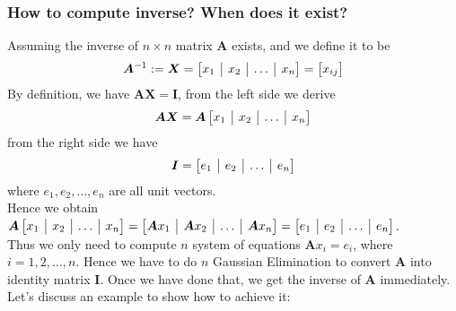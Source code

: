 \subsubsection{How to compute inverse? When does it exist?}
Assuming the inverse of $n\times n$ matrix $\bm A$ exists, and we define it to be
\[
\bm A^{-1}:=\bm X = \left[
\begin{array}{@{}c|c|c|c@{}}
x_1&x_2&\ldots&x_n
\end{array} \right] = \begin{bmatrix}
x_{ij}
\end{bmatrix}
\]
By definition, we have $\bm A\bm X = \bm I$, from the left side we derive
\[
\bm A\bm X = \bm A\left[
\begin{array}{@{}c|c|c|c@{}}
x_1&x_2&\ldots&x_n
\end{array} \right]
\]
from the right side we have
\[
\bm I = \left[
\begin{array}{@{}c|c|c|c@{}}
e_1&e_2&\ldots&e_n
\end{array} \right]
\]
where $e_1,e_2,\dots,e_n$ are all unit vectors.\\
Hence we obtain $\bm A\left[
\begin{array}{@{}c|c|c|c@{}}
x_1&x_2&\ldots&x_n
\end{array} \right] = \left[
\begin{array}{@{}c|c|c|c@{}}
\bm Ax_1&\bm Ax_2&\ldots&\bm Ax_n
\end{array} \right] = \left[
\begin{array}{@{}c|c|c|c@{}}
e_1&e_2&\ldots&e_n
\end{array} \right]$.\\
Thus we only need to compute $n$ system of equations $\bm Ax_i = e_i$, where $i=1,2,\dots,n$. Hence we have to do $n$ Gaussian Elimination to convert $\bm A$ into identity matrix $\bm I$. Once we have done that, we get the inverse of $\bm A$ immediately. Let's discuss an example to show how to achieve it:
